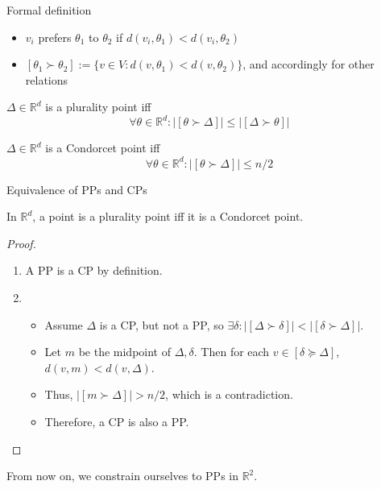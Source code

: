 \documentclass{beamer}
\newcommand{\RR}{\mathbb{R}}
\newcommand{\preferers}[3][\succ]{[#2 #1 #3]}
\newcommand{\npreferers}[3][\succ]{\lvert\preferers[#1]{#2}{#3}\rvert}
\newcommand{\eqspacing}[2]{%
  \setlength\abovedisplayskip{#1}%
  \setlength\belowdisplayskip{#2}%
}
\begin{document}
\begin{frame}{Formal definition}
  \begin{definition}[Preference]
    \begin{itemize}
    \item \(v_i\) prefers \(\theta_1\) to \(\theta_2\) if \(d(v_i, \theta_1) < d(v_i, \theta_2)\)
    \item \(\preferers{\theta_1}{\theta_2}  := \{v \in V : d(v, \theta_1) < d(v, \theta_2)\}\), and
      accordingly for other relations
    \end{itemize}
  \end{definition}
  \begin{definition}
    \eqspacing{0pt}{0pt}
    \(\Delta \in \RR^d\) is a plurality point iff
    \begin{equation*}
      \forall \theta \in \RR^d : \npreferers{\theta}{\Delta} \leq \npreferers{\Delta}{\theta}
    \end{equation*}
  \end{definition}
  \begin{definition}
    \eqspacing{0pt}{0pt}
    \(\Delta \in \RR^d\) is a Condorcet point iff
    \begin{equation*}
      \forall \theta \in \RR^d : \npreferers{\theta}{\Delta} \leq n/2
    \end{equation*}
  \end{definition}
\end{frame}


\begin{frame}{Equivalence of PPs and CPs}
  \begin{lemma}[Equivalence]  %
    In \(\RR^d\), a point is a plurality point iff it is a Condorcet point.
  \end{lemma}
  \begin{proof}
    \begin{enumerate}
    \item A PP is a CP by definition.
    \item
      \begin{itemize}
      \item Assume \(\Delta\) is a CP, but not a PP, so
        \(\exists \delta: \npreferers{\Delta}{\delta} < \npreferers{\delta}{\Delta}\).
      \item Let \(m\) be the midpoint of \(\Delta, \delta\).  Then for each
        \(v \in \preferers[\succeq]{\delta}{\Delta}\),
        \(d(v, m) < d(v, \Delta)\).
      \item Thus, \(\npreferers{m}{\Delta} > n/2\), which is a contradiction.
      \item Therefore, a CP is also a PP.
      \end{itemize}
    \end{enumerate}
  \end{proof}

  From now on, we constrain ourselves to PPs in \(\RR^2\).  
\end{frame}
\end{document}
